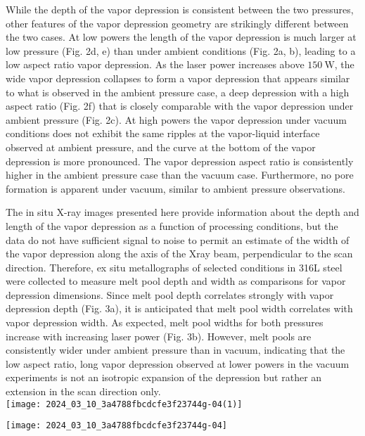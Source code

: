 \documentclass[10pt]{article}
\begin{document}
While the depth of the vapor depression is consistent between the two pressures, other features of the vapor depression geometry are strikingly different between the two cases. At low powers the length of the vapor depression is much larger at low pressure (Fig. 2d, e) than under ambient conditions (Fig. 2a, b), leading to a low aspect ratio vapor depression. As the laser power increases above $150 \mathrm{~W}$, the wide vapor depression collapses to form a vapor depression that appears similar to what is observed in the ambient pressure case, a deep depression with a high aspect ratio (Fig. 2f) that is closely comparable with the vapor depression under ambient pressure (Fig. 2c). At high powers the vapor depression under vacuum conditions does not exhibit the same ripples at the vapor-liquid interface observed at ambient pressure, and the curve at the bottom of the vapor depression is more pronounced. The vapor depression aspect ratio is consistently higher in the ambient pressure case than the vacuum case. Furthermore, no pore formation is apparent under vacuum, similar to ambient pressure observations.

The in situ X-ray images presented here provide information about the depth and length of the vapor depression as a function of processing conditions, but the data do not have sufficient signal to noise to permit an estimate of the width of the vapor depression along the axis of the Xray beam, perpendicular to the scan direction. Therefore, ex situ metallographs of selected conditions in 316L steel were collected to measure melt pool depth and width as comparisons for vapor depression dimensions. Since melt pool depth correlates strongly with vapor depression depth (Fig. 3a), it is anticipated that melt pool width correlates with vapor depression width. As expected, melt pool widths for both pressures increase with increasing laser power (Fig. 3b). However, melt pools are consistently wider under ambient pressure than in vacuum, indicating that the low aspect ratio, long vapor depression observed at lower powers in the vacuum experiments is not an isotropic expansion of the depression but rather an extension in the scan direction only.\\
\texttt{[image: 2024\_03\_10\_3a4788fbcdcfe3f23744g-04(1)]}

\begin{center}
\texttt{[image: 2024\_03\_10\_3a4788fbcdcfe3f23744g-04]}
\end{center}
\end{document}
